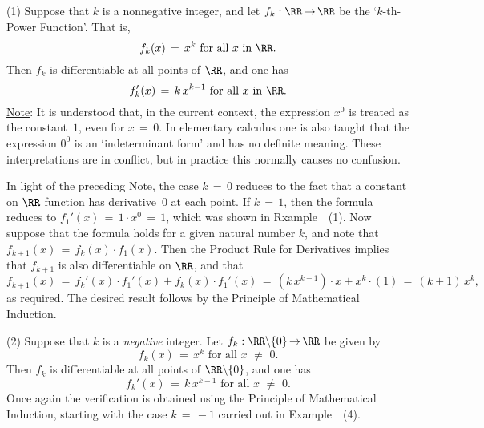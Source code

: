 \hspace*{\parindent}(1) Suppose that $k$ is a nonnegative integer, and let $f_{k}:{\RR} \,{\rightarrow}\, {\RR}$ be the `$k$-th-Power Function'. That is,
        \begin{displaymath}
        f_{k}(x) \,=\, x^{k} \mbox{ for all $x$ in ${\RR}$}.
        \end{displaymath}
    Then $f_{k}$ is differentiable at all points of ${\RR}$, and one has
        \begin{equation}
        \label{EqnE.25A}
        f_{k}'(x) \,=\, k\,x^{k-1} \mbox{ for all $x$ in ${\RR}$}.
        \end{equation}
        \underline{Note}: It is understood that, in the current context, the expression $x^{0}$ is treated as the constant~$1$, even for $x \,=\, 0$.
    In elementary calculus one is also taught that the expression $0^{0}$ is an `indeterminant form' and has no definite meaning.
    These interpretations are in conflict, but in practice this normally causes no confusion.

        In light of the preceding Note, the case $k \,=\, 0$ reduces to the fact that a constant on ${\RR}$ function has derivative~$0$ at each point.
    If $k \,=\, 1$, then the formula reduces to $f_{1}'(x) \,=\, 1{\cdot}x^{0} \,=\, 1$, which was shown in Rxample~~(1).
    Now suppose that the formula holds for a given natural number $k$, and note that $f_{k+1}(x) \,=\, f_{k}(x){\cdot}f_{1}(x)$.
    Then the Product Rule for Derivatives implies that $f_{k+1}$ is also differentiable on ${\RR}$, and that
        \begin{displaymath}
        f_{k+1}(x) \,=\, f_{k}'(x){\cdot}f_{1}'(x) + f_{k}(x){\cdot}f_{1}'(x)
     \,=\, 
        (k\,x^{k-1}){\cdot}x + x^{k}{\cdot}(1) \,=\, (k+1)\,x^{k},
        \end{displaymath}
    as required. The desired result follows by the Principle of Mathematical Induction.

\V

        (2) Suppose that $k$ is a {\em negative} integer.
    Let $f_{k}:{\RR}{\setminus}\{0\} \,{\rightarrow}\, {\RR}$ be given by
        \begin{displaymath}
        f_{k}(x) \,=\, x^{k} \mbox{ for all $x \,\,{\neq}\,\, 0$}.
        \end{displaymath}
    Then $f_{k}$ is differentiable at all points of ${\RR}{\setminus}\{0\}$, and one has
        \begin{equation}
        \label{EqnE.25B}
        f_{k}'(x) \,=\, k\,x^{k-1} \mbox{ for all $x \,\,{\neq}\,\, 0$}.
        \end{equation}
    Once again the verification is obtained using the Principle of Mathematical Induction,
    starting with the case $k \,=\, -1$ carried out in Example~~(4).


